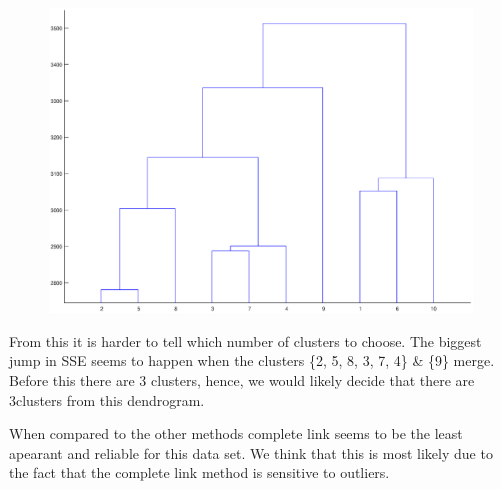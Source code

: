 \documentclass{article}
\begin{document}
		\begin{figure}[h!]
		\begin{center} 
			\includegraphics[scale=0.4]{complete.eps} 
		\end{center}  
		\label{fig:M8}
	\end{figure}
	
	From this it is harder to tell which number of clusters to choose. The biggest jump in SSE seems to happen when the clusters \{2, 5, 8, 3, 7, 4\} \& \{9\} merge. Before this there are 3 clusters, hence, we would likely decide that there are 3clusters from this dendrogram. 
	
	When compared to the other methods complete link seems to be the least apearant and reliable for this data set. We think that this is most likely due to the fact that the complete link method is sensitive to outliers.
	
	
\end{document}
